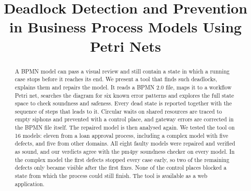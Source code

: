 \documentclass[conference]{IEEEtran}
\begin{document}
\title{Deadlock Detection and Prevention in Business Process Models Using Petri Nets}

\author{
\and
{}
\and
{}
}

\maketitle

\begin{abstract}
A BPMN model can pass a visual review and still contain a state in which a running case stops before it
reaches its end. We present a tool that finds such deadlocks, explains them and repairs the model. It reads a
BPMN 2.0 file, maps it to a workflow Petri net, searches the diagram for six known error patterns and explores
the full state space to check soundness and safeness. Every dead state is reported together with the sequence of
steps that leads to it. Circular waits on shared resources are traced to empty siphons and prevented with a
control place, and gateway errors are corrected in the BPMN file itself. The repaired model is then analysed
again. We tested the tool on 16 models: eleven from a loan approval process, including a complex model with
five defects, and five from other domains. All eight faulty models were repaired and verified as sound, and our
verdicts agree with the pm4py soundness checker on every model. In the complex model the first defects stopped
every case early, so two of the remaining defects only became visible after the first fixes. None of the
control places blocked a state from which the process could still finish. The tool is available as a web
application.
\end{abstract}
\end{document}
